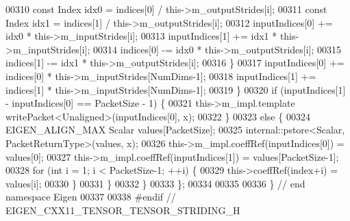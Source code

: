 \begin{DoxyCode}
00310         \textcolor{keyword}{const} Index idx0 = indices[0] / this->m\_outputStrides[i];
00311         \textcolor{keyword}{const} Index idx1 = indices[1] / this->m\_outputStrides[i];
00312         inputIndices[0] += idx0 * this->m\_inputStrides[i];
00313         inputIndices[1] += idx1 * this->m\_inputStrides[i];
00314         indices[0] -= idx0 * this->m\_outputStrides[i];
00315         indices[1] -= idx1 * this->m\_outputStrides[i];
00316       \}
00317       inputIndices[0] += indices[0] * this->m\_inputStrides[NumDims-1];
00318       inputIndices[1] += indices[1] * this->m\_inputStrides[NumDims-1];
00319     \}
00320     \textcolor{keywordflow}{if} (inputIndices[1] - inputIndices[0] == PacketSize - 1) \{
00321       this->m\_impl.template writePacket<Unaligned>(inputIndices[0], x);
00322     \}
00323     \textcolor{keywordflow}{else} \{
00324       EIGEN\_ALIGN\_MAX Scalar values[PacketSize];
00325       internal::pstore<Scalar, PacketReturnType>(values, x);
00326       this->m\_impl.coeffRef(inputIndices[0]) = values[0];
00327       this->m\_impl.coeffRef(inputIndices[1]) = values[PacketSize-1];
00328       \textcolor{keywordflow}{for} (\textcolor{keywordtype}{int} i = 1; i < PacketSize-1; ++i) \{
00329         this->coeffRef(index+i) = values[i];
00330       \}
00331     \}
00332   \}
00333 \};
00334 
00335 
00336 \} \textcolor{comment}{// end namespace Eigen}
00337 
00338 \textcolor{preprocessor}{#endif // EIGEN\_CXX11\_TENSOR\_TENSOR\_STRIDING\_H}
\end{DoxyCode}
